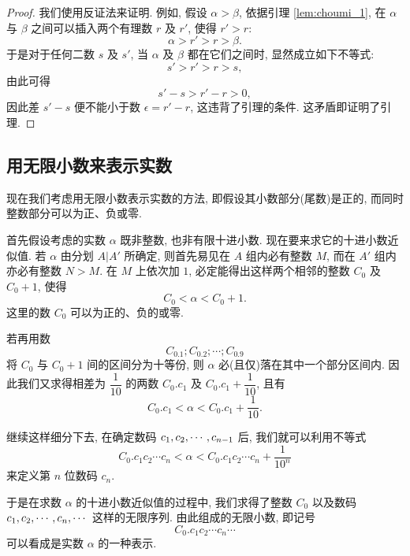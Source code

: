 \begin{proof}
    我们使用反证法来证明.
    例如, 假设 $\alpha > \beta$, 依据引理 \ref{lem:choumi_1}, 在 $\alpha$ 与 $\beta$ 之间可以插入两个有理数 $r$ 及 $r'$, 使得 $r' > r$:
    $$
    \alpha > r' > r > \beta.
    $$
    于是对于任何二数 $s$ 及 $s'$, 当 $\alpha$ 及 $\beta$ 都在它们之间时, 显然成立如下不等式:
    $$
    s' > r' > r > s,
    $$
    由此可得
    $$
    s' - s > r' - r > 0,
    $$
    因此差 $s' - s$ 便不能小于数 $\epsilon = r' - r$, 这违背了引理的条件.
    这矛盾即证明了引理.
\end{proof}

\subsection{用无限小数来表示实数} \label{subsec:9}

现在我们考虑用无限小数表示实数的方法,
即假设其小数部分(尾数)是正的,
而同时整数部分可以为正、负或零.

首先假设考虑的实数 $\alpha$ 既非整数, 也非有限十进小数.
现在要来求它的十进小数近似值.
若 $\alpha$ 由分划 $A|A'$ 所确定,
则首先易见在 $A$ 组内必有整数 $M$,
而在 $A'$ 组内亦必有整数 $N > M$.
在 $M$ 上依次加 $1$,
必定能得出这样两个相邻的整数 $C_0$ 及 $C_0 + 1$, 使得
$$
C_0 < \alpha < C_0 + 1.
$$
这里的数 $C_0$ 可以为正的、负的或零.

若再用数
$$C_0.1; C_0.2; \cdots; C_0.9$$
将 $C_0$ 与 $C_0 + 1$ 间的区间分为十等份,
则 $\alpha$ 必(且仅)落在其中一个部分区间内.
因此我们又求得相差为 $\dfrac{1}{10}$ 的两数 $C_0.c_1$ 及 $C_0.c_1 + \dfrac{1}{10}$, 且有
$$
C_0.c_1 < \alpha < C_0.c_1 + \dfrac{1}{10}.
$$

继续这样细分下去,
在确定数码 $\seq[n-1]{c}$ 后,
我们就可以利用不等式
\begin{equation}\label{eq:decimal_approx_1}
C_0.c_1 c_2 \cdots c_n < \alpha < C_0.c_1 c_2 \cdots c_n + \dfrac{1}{10^n}
\end{equation}
来定义第 $n$ 位数码 $c_n$.

于是在求数 $\alpha$ 的十进小数近似值的过程中,
我们求得了整数 $C_0$ 以及数码 $\seq[n]{c}, \cdots$ 这样的无限序列.
由此组成的{\kaishu 无限小数, 即记号
\begin{equation}\label{eq:decimal_approx_2}
C_0.c_1 c_2 \cdots c_n \cdots
\end{equation}
可以看成是实数 $\alpha$ 的一种表示}.

